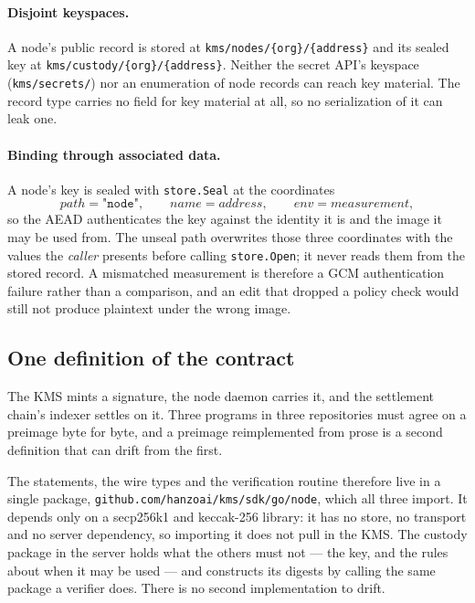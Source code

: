\documentclass[11pt,a4paper]{article}
\newcommand{\code}[1]{\texttt{#1}}
\begin{document}
\paragraph{Disjoint keyspaces.} A node's public record is stored at
\code{kms/nodes/\{org\}/\{address\}} and its sealed key at
\code{kms/custody/\{org\}/\{address\}}. Neither the secret API's keyspace
(\code{kms/secrets/}) nor an enumeration of node records can reach key material.
The record type carries no field for key material at all, so no serialization of
it can leak one.

\paragraph{Binding through associated data.} A node's key is sealed with
\code{store.Seal} at the coordinates
\[
  \mathit{path} = \texttt{"node"}, \qquad
  \mathit{name} = \mathit{address}, \qquad
  \mathit{env}  = \mathit{measurement},
\]
so the AEAD authenticates the key against the identity it is and the image it may
be used from. The unseal path overwrites those three coordinates with the values
the \emph{caller} presents before calling \code{store.Open}; it never reads them
from the stored record. A mismatched measurement is therefore a GCM
authentication failure rather than a comparison, and an edit that dropped a
policy check would still not produce plaintext under the wrong image.

\subsection{One definition of the contract}

The KMS mints a signature, the node daemon carries it, and the settlement
chain's indexer settles on it. Three programs in three repositories must agree
on a preimage byte for byte, and a preimage reimplemented from prose is a second
definition that can drift from the first.

The statements, the wire types and the verification routine therefore live in a
single package, \code{github.com/hanzoai/kms/sdk/go/node}, which all three
import. It depends only on a secp256k1 and keccak-256 library: it has no store,
no transport and no server dependency, so importing it does not pull in the KMS.
The custody package in the server holds what the others must not --- the key,
and the rules about when it may be used --- and constructs its digests by calling
the same package a verifier does. There is no second implementation to drift.
\end{document}
